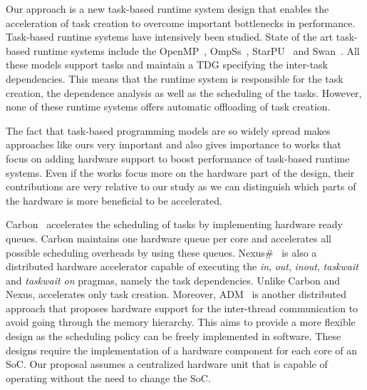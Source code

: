 





Our approach is a new task-based runtime system design that enables the acceleration of task creation to overcome important bottlenecks in performance.
Task-based runtime systems have intensively been studied.
State of the art task-based runtime systems include the OpenMP~\cite{OpenMP}, OmpSs~\cite{OmpSs_PPL11}, StarPU~\cite{starpu} and Swan~\cite{Vandierendonck:PACT2011}.
All these models support tasks and maintain a TDG specifying the inter-task dependencies.
This means that the runtime system is responsible for the task creation, the dependence analysis as well as the scheduling of the tasks.
However, none of these runtime systems offers automatic offloading of task creation.

The fact that task-based programming models are so widely spread makes approaches like ours very important and also gives importance to works that focus on adding hardware support to boost performance of task-based runtime systems.
Even if the works focus more on the hardware part of the design, their contributions are very relative to our study as we can distinguish which parts of the hardware is more beneficial to be accelerated.

Carbon~\cite{Carbon} accelerates the scheduling of tasks by implementing hardware ready queues.
Carbon maintains one hardware queue per core and accelerates all possible scheduling overheads by using these queues.
Nexus\#~\cite{Nexus} is also a distributed hardware accelerator capable of executing the \textit{in}, \textit{out}, \textit{inout}, \textit{taskwait} and \textit{taskwait on} pragmas, namely the task dependencies.
Unlike Carbon and Nexus, {\proposal} accelerates only task creation.
Moreover, ADM~\cite{Sanchez:2010} is another distributed approach that proposes hardware support for the inter-thread communication to avoid going through the memory hierarchy. 
This aims to provide a more flexible design as the scheduling policy can be freely implemented in software.
These designs require the implementation of a hardware component for each core of an SoC.
Our proposal assumes a centralized hardware unit that is capable of operating without the need to change the SoC.

